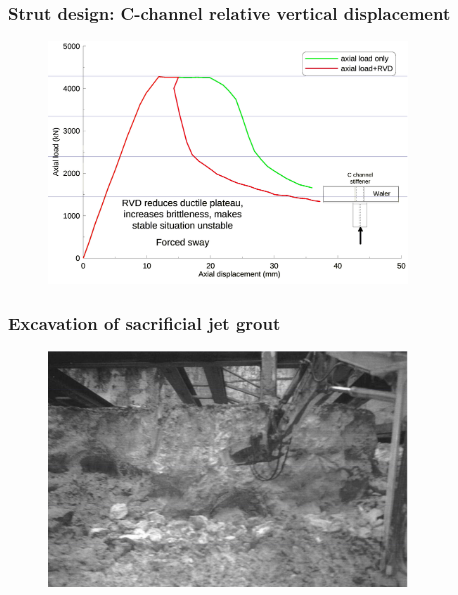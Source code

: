 \documentclass[notes]{beamer}
\begin{document}
\begin{frame}
\frametitle{Strut design: C-channel relative vertical displacement}
\begin{figure}[ht]
	\centering
	\includegraphics[width=0.85\textwidth]{figs/c-channel-effect-relative-vertical-disp.png}
\end{figure}
\end{frame}

\begin{frame}
\frametitle{Excavation of sacrificial jet grout}
\begin{figure}[ht]
	\centering
	\includegraphics[width=0.85\textwidth]{figs/excavation-jet-grout.png}
\end{figure}
\end{frame}
\end{document}
